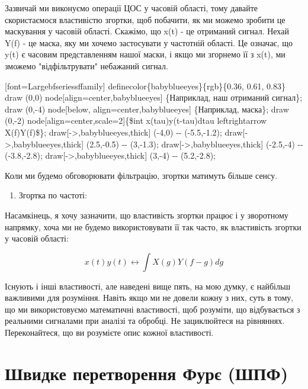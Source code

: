 \href{../_images/masking.svg}{}

Зазвичай ми виконуємо операції ЦОС у часовій області, тому давайте
скористаємося властивістю згортки, щоб побачити, як ми можемо зробити це
маскування у часовій області. Скажімо, що x(t) - це отриманий сигнал.
Нехай Y(f) - це маска, яку ми хочемо застосувати у частотній області. Це
означає, що y(t) є часовим представленням нашої маски, і якщо ми
згорнемо її з x(t), ми зможемо "відфільтрувати" небажаний сигнал.

{[}font=Largebfseriessffamily{]}
definecolor\{babyblueeyes\}\{rgb\}\{0.36, 0.61, 0.83\} draw (0,0)
node{[}align=center,babyblueeyes{]} \{Наприклад, наш отриманий сигнал\};
draw (0,-4) node{[}below, align=center,babyblueeyes{]} \{Наприклад,
маска\}; draw (0,-2) node{[}align=center,scale=2{]}\{\$int
x(tau)y(t-tau)dtau leftrightarrow X(f)Y(f)\$\};
draw{[}-\textgreater,babyblueeyes,thick{]} (-4,0) -\/- (-5.5,-1.2);
draw{[}-\textgreater,babyblueeyes,thick{]} (2.5,-0.5) -\/- (3,-1.3);
draw{[}-\textgreater,babyblueeyes,thick{]} (-2.5,-4) -\/- (-3.8,-2.8);
draw{[}-\textgreater,babyblueeyes,thick{]} (3,-4) -\/- (5.2,-2.8);

Коли ми будемо обговорювати фільтрацію, згортки матимуть більше сенсу.

\begin{enumerate}
\def\labelenumi{\arabic{enumi}.}
\setcounter{enumi}{4}
\tightlist
\item
  Згортка по частоті:
\end{enumerate}

Насамкінець, я хочу зазначити, що властивість згортки працює і у
зворотному напрямку, хоча ми не будемо використовувати її так часто, як
властивість згортки у часовій області:

\[x(t)y(t) \leftrightarrow \int X(g) Y(f-g) dg\]

Існують і інші властивості, але наведені вище п\textquotesingle ять, на
мою думку, є найбільш важливими для розуміння. Навіть якщо ми не довели
кожну з них, суть в тому, що ми використовуємо математичні властивості,
щоб розуміти, що відбувається з реальними сигналами при аналізі та
обробці. Не зациклюйтеся на рівняннях. Переконайтеся, що ви розумієте
опис кожної властивості.

\section{Швидке перетворення Фур\textquotesingle є
(ШПФ)}\label{ux448ux432ux438ux434ux43aux435-ux43fux435ux440ux435ux442ux432ux43eux440ux435ux43dux43dux44f-ux444ux443ux440ux454-ux448ux43fux444}

